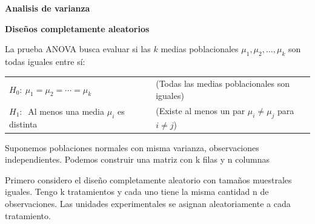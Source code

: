 \documentclass[12pt,a4paper]{article}
\begin{document}
\shorthandoff{<>}

\hfill{\bfseries\footnotesize Analisis de varianza}

\vspace{-4pt}
\begin{center}
{\fontsize{15}{18}\selectfont\bfseries Diseños completamente aleatorios}
\end{center}

La prueba ANOVA busca evaluar si las $k$ medias poblacionales $\mu_1,\mu_2,\ldots,\mu_k$ son todas iguales entre sí:

\begin{center}
\begin{tabular}{@{}l l@{}}
$H_0: \ \mu_1=\mu_2=\cdots=\mu_k$ & \hspace{0.6cm}(Todas las medias poblacionales son iguales) \\
$H_1: \ $ Al menos una media $\mu_i$ es distinta & \hspace{0.6cm}(Existe al menos un par $\mu_i \neq \mu_j$ para $i\neq j$) \\
\end{tabular}
\end{center}

\hspace{16pt}\begin{minipage}{0.94\linewidth}
Suponemos poblaciones normales con misma varianza, observaciones independientes. Podemos construir una matriz con k filas y n columnas

\vspace{6pt}
Primero considero el diseño completamente aleatorio con tamaños muestrales iguales. Tengo k tratamientos y cada uno tiene la misma cantidad n de observaciones. Las unidades experimentales se asignan aleatoriamente a cada tratamiento.
\end{minipage}
\end{document}
